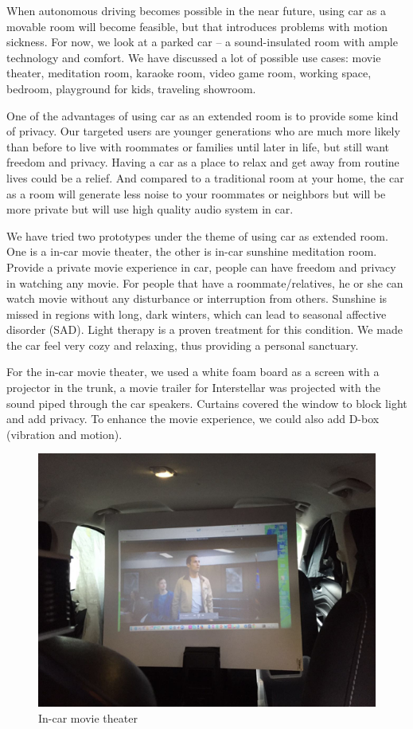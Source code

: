 When autonomous driving becomes possible in the near future, using car as a movable room will become feasible, but that introduces problems with motion sickness. For now, we look at a parked car – a sound-insulated room with ample technology and comfort. We have discussed a lot of possible use cases: movie theater, meditation room, karaoke room, video game room, working space, bedroom, playground for kids, traveling showroom.

One of the advantages of using car as an extended room is to provide some kind of privacy. Our targeted users are younger generations who are much more likely than before to live with roommates or families until later in life, but still want freedom and privacy. Having a car as a place to relax and get away from routine lives could be a relief. And compared to a traditional room at your home, the car as a room will generate less noise to your roommates or neighbors but will be more private but will use high quality audio system in car.

We have tried two prototypes under the theme of using car as extended room. One is a in-car movie theater, the other is in-car sunshine meditation room. Provide a private movie experience in car, people can have freedom and privacy in watching any movie. For people that have a roommate/relatives, he or she can watch movie without any disturbance or interruption from others. Sunshine is missed in regions with long, dark winters, which can lead to seasonal affective disorder (SAD). Light therapy is a proven treatment for this condition. We made the car feel very cozy and relaxing, thus providing a personal sanctuary.

For the in-car movie theater, we used a white foam board as a screen with a projector in the trunk, a movie trailer for Interstellar was projected with the sound piped through the car speakers. Curtains covered the window to block light and add privacy. To enhance the movie experience, we could also add D-box (vibration and motion). 

\begin{figure}
\centering
\includegraphics[width=5in]{Figures/Prototypes/DarkHorse/DarkHorseTheater1.png}
	\caption{In-car movie theater}
		\label{fig:DarkHorseTheater1}
\end{figure}

